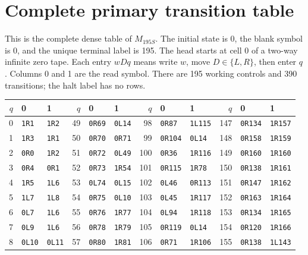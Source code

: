 \clearpage
\section{Complete primary transition table}
\label{sec:complete-table}
This is the complete dense table of $M_{195S}$. The initial state is 0,
the blank symbol is 0, and the unique terminal label is 195. The head starts
at cell 0 of a two-way infinite zero tape. Each entry $wDq$ means write
$w$, move $D\in\{L,R\}$, then enter $q$. Columns 0 and 1 are the read symbol.
There are 195 working controls and 390 transitions; the halt label has no rows.
\begin{center}\scriptsize\setlength{\tabcolsep}{3pt}
\renewcommand{\arraystretch}{1.0}
\begin{tabular}{@{}rll@{\hspace{4mm}}rll@{\hspace{4mm}}rll@{\hspace{4mm}}rll@{}}
\toprule
$q$&0&1&$q$&0&1&$q$&0&1&$q$&0&1\\
\midrule
0 & \texttt{1R1} & \texttt{1R2} & 49 & \texttt{0R69} & \texttt{0L14} & 98 & \texttt{0R87} & \texttt{1L115} & 147 & \texttt{0R134} & \texttt{1R157}\\
1 & \texttt{1R3} & \texttt{1R1} & 50 & \texttt{0R70} & \texttt{0R71} & 99 & \texttt{0R104} & \texttt{0L14} & 148 & \texttt{0R158} & \texttt{1R159}\\
2 & \texttt{0R0} & \texttt{1R2} & 51 & \texttt{0R72} & \texttt{0L49} & 100 & \texttt{0R36} & \texttt{1R116} & 149 & \texttt{0R160} & \texttt{1R160}\\
3 & \texttt{0R4} & \texttt{0R1} & 52 & \texttt{0R73} & \texttt{1R54} & 101 & \texttt{0R115} & \texttt{1R78} & 150 & \texttt{0R138} & \texttt{1R161}\\
4 & \texttt{1R5} & \texttt{1L6} & 53 & \texttt{0L74} & \texttt{0L15} & 102 & \texttt{0L46} & \texttt{0R113} & 151 & \texttt{0R147} & \texttt{1R162}\\
5 & \texttt{1L7} & \texttt{1L8} & 54 & \texttt{0R75} & \texttt{0L10} & 103 & \texttt{0L45} & \texttt{1R117} & 152 & \texttt{0R163} & \texttt{1R164}\\
6 & \texttt{0L7} & \texttt{1L6} & 55 & \texttt{0R76} & \texttt{1R77} & 104 & \texttt{0L94} & \texttt{1R118} & 153 & \texttt{0R134} & \texttt{1R165}\\
7 & \texttt{0L9} & \texttt{1L6} & 56 & \texttt{0R78} & \texttt{1R79} & 105 & \texttt{0R119} & \texttt{0L14} & 154 & \texttt{0R120} & \texttt{1R166}\\
8 & \texttt{0L10} & \texttt{0L11} & 57 & \texttt{0R80} & \texttt{1R81} & 106 & \texttt{0R71} & \texttt{1R106} & 155 & \texttt{0R138} & \texttt{1L143}\\

\end{tabular}
\end{center}
